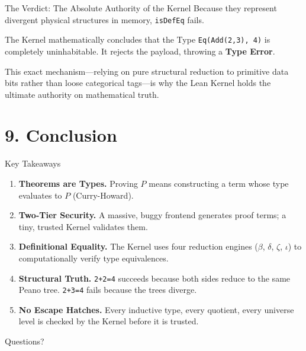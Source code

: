 \documentclass[10pt,aspectratio=169]{beamer}
\begin{document}
\begin{frame}[fragile]{The Verdict: The Absolute Authority of the Kernel}
    Because they represent divergent physical structures in memory, \verb|isDefEq| fails.
    
    The Kernel mathematically concludes that the Type \verb|Eq(Add(2,3), 4)| is completely uninhabitable. It rejects the payload, throwing a \textbf{Type Error}.
    
    This exact mechanism—relying on pure structural reduction to primitive data bits rather than loose categorical tags—is why the Lean Kernel holds the ultimate authority on mathematical truth.
\end{frame}

\section{9. Conclusion}

\begin{frame}[fragile]{Key Takeaways}
    \begin{enumerate}
        \item \textbf{Theorems are Types.} Proving $P$ means constructing a term whose type evaluates to $P$ (Curry-Howard).
        \item \textbf{Two-Tier Security.} A massive, buggy frontend generates proof terms; a tiny, trusted Kernel validates them.
        \item \textbf{Definitional Equality.} The Kernel uses four reduction engines ($\beta$, $\delta$, $\zeta$, $\iota$) to computationally verify type equivalences.
        \item \textbf{Structural Truth.} \verb|2+2=4| succeeds because both sides reduce to the same Peano tree. \verb|2+3=4| fails because the trees diverge.
        \item \textbf{No Escape Hatches.} Every inductive type, every quotient, every universe level is checked by the Kernel before it is trusted.
    \end{enumerate}
\end{frame}


\begin{frame}[standout]
    Questions?
\end{frame}
\end{document}
